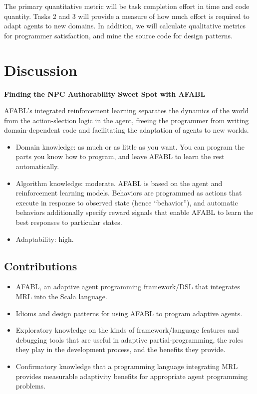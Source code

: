 The primary quantitative metric will be task completion effort in time and code quantity.  Tasks 2 and 3 will provide a measure of how much effort is required to adapt agents to new domains.  In addition, we will calculate qualitative metrics for programmer satisfaction, and mine the source code for design patterns.


\section{Discussion}

{\bf Finding the NPC Authorability Sweet Spot with AFABL}

AFABL's integrated reinforcement learning separates the dynamics of the world from the action-slection logic in the agent, freeing the programmer from writing domain-dependent code and facilitating the adaptation of agents to new worlds.

\begin{itemize}
\item Domain knowledge: as much or as little as you want.  You can program the parts you know how to program, and leave AFABL to learn the rest automatically.
\item Algorithm knowledge: moderate.  AFABL is based on the agent and
  reinforcement learning models.  Behaviors are programmed as actions
  that execute in response to observed state (hence ``behavior''), and
  automatic behaviors additionally specify reward signals that enable
  AFABL to learn the best responses to particular states.
\item Adaptability: high.
\end{itemize}


\subsection{Contributions}

\begin{itemize}
\item AFABL, an adaptive agent programming framework/DSL that integrates MRL into the Scala language.
\item Idioms and design patterns for using AFABL to program adaptive agents.
\item Exploratory knowledge on the kinds of framework/language features and debugging tools that are useful in adaptive partial-programming, the roles they play in the development process, and the benefits they provide.
\item Confirmatory knowledge that a programming language integrating MRL provides measurable adaptivity benefits for appropriate agent programming problems.
\end{itemize}
